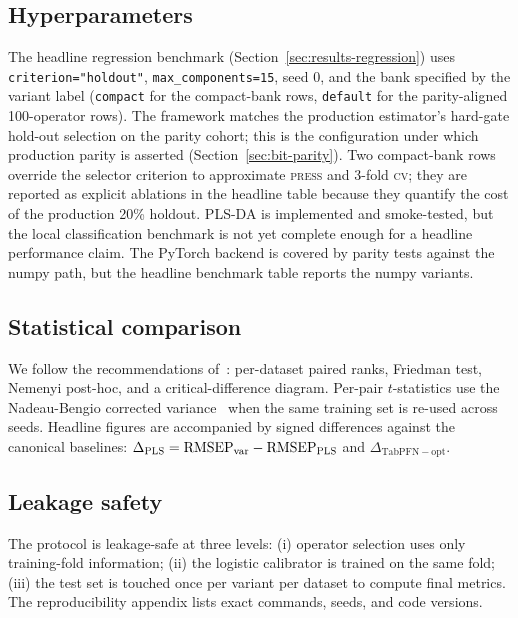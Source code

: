 \documentclass[review,a4paper]{elsarticle}
\newcommand{\PLS}{\textsc{PLS}\xspace}
\newcommand{\PLSDA}{\textsc{PLS-DA}\xspace}
\begin{document}
\subsection{Hyperparameters}
The headline regression benchmark
(Section~\ref{sec:results-regression}) uses
\verb|criterion="holdout"|, \verb|max_components=15|, seed $0$, and
the bank specified by the variant label (\texttt{compact} for the
compact-bank rows, \texttt{default} for the parity-aligned 100-operator
rows). The framework matches the production estimator's hard-gate
hold-out selection on the parity cohort; this is the configuration
under which production parity is asserted
(Section~\ref{sec:bit-parity}). Two compact-bank rows override the
selector criterion to approximate \textsc{press} and 3-fold
\textsc{cv}; they are reported as explicit ablations in the headline
table because they quantify the cost of the production 20\% holdout.
\PLSDA is implemented and smoke-tested, but the local classification
benchmark is not yet complete enough for a headline performance claim.
The PyTorch backend is covered by parity tests against the numpy path,
but the headline benchmark table reports the numpy variants.

\subsection{Statistical comparison}
We follow the recommendations
of~\cite{demsar2006statistical, benavoli2017time}: per-dataset paired
ranks, Friedman test, Nemenyi post-hoc, and a critical-difference
diagram. Per-pair $t$-statistics use the Nadeau-Bengio corrected
variance~\cite{nadeau2003inference} when the same training set is
re-used across seeds. Headline figures are accompanied by signed
differences against the canonical baselines: $\Delta_{\PLS}=
\mathrm{RMSEP}_{\mathrm{var}}-\mathrm{RMSEP}_{\PLS}$ and
$\Delta_{\mathrm{TabPFN-opt}}$.

\subsection{Leakage safety}
The protocol is leakage-safe at three levels: (i) operator selection
uses only training-fold information; (ii) the logistic calibrator is
trained on the same fold; (iii) the test set is touched once per
variant per dataset to compute final metrics. The reproducibility
appendix lists exact commands, seeds, and code versions.
\end{document}
